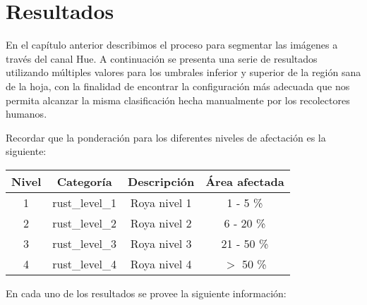 \chapter{Resultados}
En el capítulo anterior describimos el proceso para segmentar las imágenes a través del canal Hue. A continuación se presenta una serie de resultados utilizando múltiples valores para los umbrales inferior y superior de la región sana de la hoja, con la finalidad de encontrar la configuración más adecuada que nos permita alcanzar la misma clasificación hecha manualmente por los recolectores humanos.

Recordar que la ponderación para los diferentes niveles de afectación es la siguiente:

\begin{center}
\begin{tabular}{|c|c|c|c|}
\hline 
\textbf{Nivel} & \textbf{Categoría} & \textbf{Descripción} & \textbf{Área afectada} \\
\hline
1 & rust\_level\_1 & Roya nivel 1 & 1 - 5 \% \\
\hline 
2 & rust\_level\_2 & Roya nivel 2 & 6 - 20 \% \\
\hline 
3 & rust\_level\_3 & Roya nivel 3 & 21 - 50 \% \\
\hline 
4 & rust\_level\_4 & Roya nivel 4 & $>$ 50 \% \\
\hline 
\end{tabular}
\end{center}

En cada uno de los resultados se provee la siguiente información:

